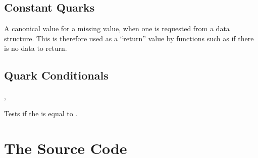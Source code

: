 \documentclass[oneside]{book}
\begin{document}
\section{Constant Quarks}

\begin{variable}{\qNoValue}
A canonical value for a missing value, when one is requested from
a data structure. This is therefore used as a \enquote{return} value
by functions such as  if there is no data to return.
\end{variable}

\section{Quark Conditionals}

\begin{function}{\QuarkVarIfNoValue,\QuarkVarIfNoValueTF}
\begin{syntax}
 
   
\end{syntax}
Tests if the  is equal to .
\begin{demohigh}
\ClistGet \cEmptyClist \lTmpaTl
\QuarkVarIfNoValueTF {} {}
\end{demohigh}
\begin{demohigh}
\SeqPop \cEmptySeq \lTmpaTl
\QuarkVarIfNoValueTF {} {}
\end{demohigh}
\begin{demohigh}
\PropSetFromKeyval {}
\PropGet {} \lTmpaTl
\QuarkVarIfNoValueTF {} {}
\end{demohigh}
\end{function}


\chapter{The Source Code}

\setlength\parskip{0pt}
\end{document}

